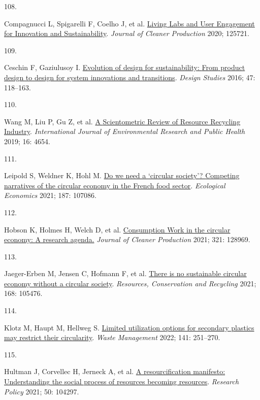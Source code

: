 \documentclass[
  12pt,
  a4paperpaper,
  onecolumn]{article}
\newlength{\cslhangindent}
\newlength{\csllabelwidth}
\newlength{\cslentryspacingunit} %
\newenvironment{CSLReferences}[2] %
 {%
  \setlength{\parindent}{0pt}
  \ifodd #1
  \let\oldpar\par
  \def\par{\hangindent=\cslhangindent\oldpar}
  \fi
  \setlength{\parskip}{#2\cslentryspacingunit}
 }%
 {}
\newcommand{\CSLLeftMargin}[1]{\parbox[t]{\csllabelwidth}{#1}}
\newcommand{\CSLRightInline}[1]{\parbox[t]{\linewidth - \csllabelwidth}{#1}\break}
\begin{document}
\begin{CSLReferences}{0}{0}
\leavevmode{}%
\CSLLeftMargin{108. }%
\CSLRightInline{Compagnucci L, Spigarelli F, Coelho J, et al.
\href{https://doi.org/10.1016/j.jclepro.2020.125721}{Living {Labs} and
{User Engagement} for {Innovation} and {Sustainability}}. \emph{Journal
of Cleaner Production} 2020; 125721.}

\leavevmode{}%
\CSLLeftMargin{109. }%
\CSLRightInline{Ceschin F, Gaziulusoy I.
\href{https://doi.org/10.1016/j.destud.2016.09.002}{Evolution of design
for sustainability: {From} product design to design for system
innovations and transitions}. \emph{Design Studies} 2016; 47: 118--163.}

\leavevmode{}%
\CSLLeftMargin{110. }%
\CSLRightInline{Wang M, Liu P, Gu Z, et al.
\href{https://doi.org/10.3390/ijerph16234654}{A {Scientometric Review}
of {Resource Recycling Industry}}. \emph{International Journal of
Environmental Research and Public Health} 2019; 16: 4654.}

\leavevmode{}%
\CSLLeftMargin{111. }%
\CSLRightInline{Leipold S, Weldner K, Hohl M.
\href{https://doi.org/10.1016/j.ecolecon.2021.107086}{Do we need a
{`circular society'}? {Competing} narratives of the circular economy in
the {French} food sector}. \emph{Ecological Economics} 2021; 187:
107086.}

\leavevmode{}%
\CSLLeftMargin{112. }%
\CSLRightInline{Hobson K, Holmes H, Welch D, et al.
\href{https://doi.org/10.1016/J.JCLEPRO.2021.128969}{Consumption {Work}
in the circular economy: {A} research agenda.} \emph{Journal of Cleaner
Production} 2021; 321: 128969.}

\leavevmode{}%
\CSLLeftMargin{113. }%
\CSLRightInline{Jaeger-Erben M, Jensen C, Hofmann F, et al.
\href{https://doi.org/10.1016/j.resconrec.2021.105476}{There is no
sustainable circular economy without a circular society}.
\emph{Resources, Conservation and Recycling} 2021; 168: 105476.}

\leavevmode{}%
\CSLLeftMargin{114. }%
\CSLRightInline{Klotz M, Haupt M, Hellweg S.
\href{https://doi.org/10.1016/J.WASMAN.2022.01.002}{Limited utilization
options for secondary plastics may restrict their circularity}.
\emph{Waste Management} 2022; 141: 251--270.}

\leavevmode{}%
\CSLLeftMargin{115. }%
\CSLRightInline{Hultman J, Corvellec H, Jerneck A, et al.
\href{https://doi.org/10.1016/j.respol.2021.104297}{A resourcification
manifesto: {Understanding} the social process of resources becoming
resources}. \emph{Research Policy} 2021; 50: 104297.}


\end{CSLReferences}
\end{document}
